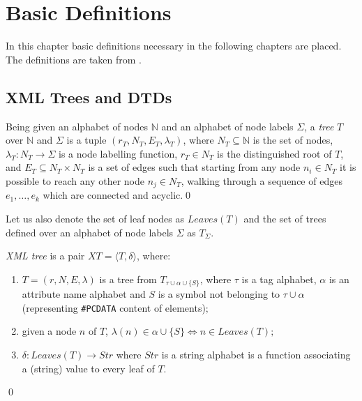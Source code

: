 \chapter{Basic Definitions}

In this chapter basic definitions necessary in the following chapters are placed. The definitions are taken from \cite{RepAndConsistentAnswer, QueryXML, ImprovingXML}.


\section{XML Trees and DTDs}
\begin{define}[Tree]
Being given an alphabet of nodes $\mathbb{N}$ and an alphabet of node labels $\Sigma$, a {\sl tree} $T$ over $\mathbb{N}$ and $\Sigma$ is a tuple $(r_T, N_T, E_T, \lambda_T)$, where $N_T \subseteq \mathbb{N}$ is the set of nodes, $\lambda_T : N_T \to \Sigma$ is a node labelling function, $r_T \in N_T$ is the distinguished root of $T$, and $E_T \subseteq N_T \times N_T$ is a set of edges such that starting from any node $n_i \in N_T$ it is possible to reach any other node $n_j \in N_T$, walking through a sequence of edges $e_1,\dots,e_k$ which are connected and acyclic.\qed
\end{define}

\noindent Let us also denote the set of leaf nodes as $Leaves(T)$ and the set of trees defined over an alphabet of node labels $\Sigma$ as $T_\Sigma$.

\begin{define}\label{xmlTree}
{\sl XML tree} is a pair $XT=\langle T,\delta \rangle$, where:
\renewcommand{\labelenumi}{\roman{enumi})}
	\begin{enumerate}
		\item $T = (r, N, E, \lambda)$ is a tree from $T_{\tau\cup\alpha\cup\{S\}}$, where $\tau$ is a tag alphabet, $\alpha$ is an attribute name alphabet and $S$ is a symbol not belonging to $\tau\cup\alpha$ (representing \texttt{\#PCDATA} content of elements)$;$
		\item given a node $n$ of $T$, $\lambda(n) \in \alpha \cup \{S\} \Leftrightarrow n \in Leaves(T);$
		\item $\delta : Leaves(T) \rightarrow Str$ where $Str$ is a string alphabet is a function associating a (string) value to every leaf of $T$.
	\end{enumerate}\qed
\end{define}

